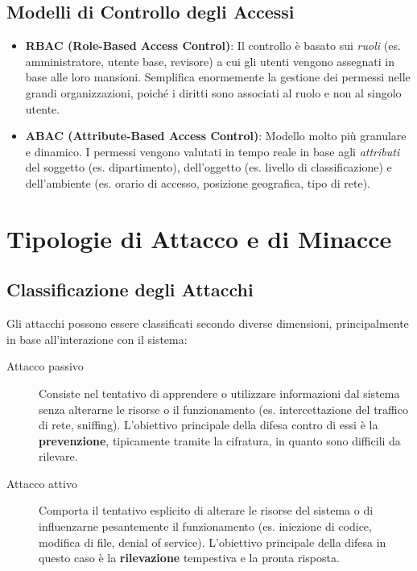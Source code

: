 \subsection{Modelli di Controllo degli Accessi}
\begin{defbox}
\begin{itemize}
    \item \textbf{RBAC (Role-Based Access Control)}: Il controllo è basato sui \textit{ruoli} (es. amministratore, utente base, revisore) a cui gli utenti vengono assegnati in base alle loro mansioni. Semplifica enormemente la gestione dei permessi nelle grandi organizzazioni, poiché i diritti sono associati al ruolo e non al singolo utente.
    \item \textbf{ABAC (Attribute-Based Access Control)}: Modello molto più granulare e dinamico. I permessi vengono valutati in tempo reale in base agli \textit{attributi} del soggetto (es. dipartimento), dell'oggetto (es. livello di classificazione) e dell'ambiente (es. orario di accesso, posizione geografica, tipo di rete).
\end{itemize}
\end{defbox}

\section{Tipologie di Attacco e di Minacce}

\subsection{Classificazione degli Attacchi}

Gli attacchi possono essere classificati secondo diverse dimensioni, principalmente in base all'interazione con il sistema:

\begin{warnbox}
\begin{description}
    \item[Attacco passivo] Consiste nel tentativo di apprendere o utilizzare informazioni dal sistema senza alterarne le risorse o il funzionamento (es. intercettazione del traffico di rete, sniffing). L'obiettivo principale della difesa contro di essi è la \textbf{prevenzione}, tipicamente tramite la cifratura, in quanto sono difficili da rilevare.
    \item[Attacco attivo] Comporta il tentativo esplicito di alterare le risorse del sistema o di influenzarne pesantemente il funzionamento (es. iniezione di codice, modifica di file, denial of service). L'obiettivo principale della difesa in questo caso è la \textbf{rilevazione} tempestiva e la pronta risposta.
\end{description}
\end{warnbox}

